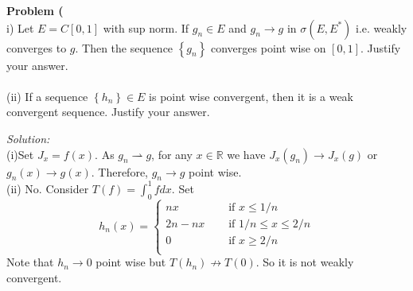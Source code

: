 \documentclass[a4paper, 11pt]{article}
\newenvironment{problem}[2][Problem]
    { \begin{mdframed}[backgroundcolor=gray!20] \textbf{#1 #2} \\}
    {  \end{mdframed}}
\newenvironment{solution}
    {\textit{Solution:}}
    {}
\begin{document}
\begin{problem}{2}
    (i) Let $E=C[0,1]$ with sup norm. If $g_{n} \in E$ and $g_{n} \rightarrow g$ in $\sigma\left(E, E^{*}\right)$ i.e. weakly converges to $g$. Then the sequence $\left\{g_{n}\right\}$ converges point wise on $[0,1]$. Justify your answer.\\ \\
    (ii) If a sequence $\left\{h_{n}\right\} \in E$ is point wise convergent, then it is a weak convergent sequence. Justify your answer.    
\end{problem}
\begin{solution}
    \ \\
    (i)Set $J_x=f(x)$. As $g_n\rightharpoonup g$, for any $x\in\mathbb R$ we have $J_x(g_n)\to J_x(g)$ or $g_n(x)\to g(x)$. Therefore, $g_n\to g$ point wise. \\
    (ii) No. Consider $T(f)=\int_{0}^1fdx$. Set 
    $$h_n(x)=\begin{cases}
        nx&\quad\text{ if }x\leq 1/n\\
        2n-nx&\quad\text{ if }1/n\leq x\leq 2/n\\
        0&\quad\text{ if }x\geq 2/n\\
    \end{cases}$$
    Note that $h_n\to 0$ point wise but $T(h_n)\not\to  T(0)$. So it is not weakly convergent.  
\end{solution}
\end{document}
